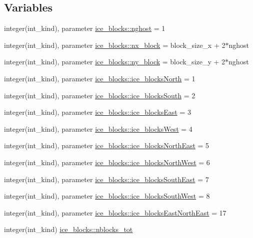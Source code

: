 \subsection*{Variables}
\begin{DoxyCompactItemize}
\item 
integer(int\_\-kind), parameter \hyperlink{namespaceice__blocks_a75dd0bf2d3d80ac626a1effa70f77a35}{ice\_\-blocks::nghost} = 1
\item 
integer(int\_\-kind), parameter \hyperlink{namespaceice__blocks_a130f3f9b102e86de209ee25eb36e44ba}{ice\_\-blocks::nx\_\-block} = block\_\-size\_\-x + 2$\ast$nghost
\item 
integer(int\_\-kind), parameter \hyperlink{namespaceice__blocks_a9ad40e7eeb19aeb81a3010e0dd997c43}{ice\_\-blocks::ny\_\-block} = block\_\-size\_\-y + 2$\ast$nghost
\item 
integer(int\_\-kind), parameter \hyperlink{namespaceice__blocks_a210c398febe5f3f1486ca6857c74eaef}{ice\_\-blocks::ice\_\-blocksNorth} = 1
\item 
integer(int\_\-kind), parameter \hyperlink{namespaceice__blocks_a99adb4e499fb158490e25611f9b2d523}{ice\_\-blocks::ice\_\-blocksSouth} = 2
\item 
integer(int\_\-kind), parameter \hyperlink{namespaceice__blocks_a8e54c9ed562029d5b5e55d9a5b9ed00e}{ice\_\-blocks::ice\_\-blocksEast} = 3
\item 
integer(int\_\-kind), parameter \hyperlink{namespaceice__blocks_a19582ab3df93a40ccf948e06353de278}{ice\_\-blocks::ice\_\-blocksWest} = 4
\item 
integer(int\_\-kind), parameter \hyperlink{namespaceice__blocks_aafd6325ce3debeffc94852fcb23a84ae}{ice\_\-blocks::ice\_\-blocksNorthEast} = 5
\item 
integer(int\_\-kind), parameter \hyperlink{namespaceice__blocks_a0f76d74a663f9c4518764417afdbcb4e}{ice\_\-blocks::ice\_\-blocksNorthWest} = 6
\item 
integer(int\_\-kind), parameter \hyperlink{namespaceice__blocks_a9b754927f41986abc5c81c88b55a4975}{ice\_\-blocks::ice\_\-blocksSouthEast} = 7
\item 
integer(int\_\-kind), parameter \hyperlink{namespaceice__blocks_a8199fdd4814a3c9865a3323bf4a484a6}{ice\_\-blocks::ice\_\-blocksSouthWest} = 8
\item 
integer(int\_\-kind), parameter \hyperlink{namespaceice__blocks_a84cf6b8a9b39a3d0b6c331832650fe43}{ice\_\-blocks::ice\_\-blocksEastNorthEast} = 17
\item 
integer(int\_\-kind) \hyperlink{namespaceice__blocks_a5b80499202c9881a6a1ff8e3375a7079}{ice\_\-blocks::nblocks\_\-tot}

\end{DoxyCompactItemize}
